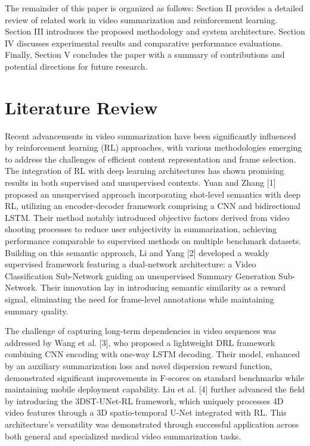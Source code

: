 \documentclass[conference]{IEEEtran}
\begin{document}
The remainder of this paper is organized as follows: Section II provides a detailed review of related work in video summarization and reinforcement learning. Section III introduces the proposed methodology and system architecture. Section IV discusses experimental results and comparative performance evaluations. Finally, Section V concludes the paper with a summary of contributions and potential directions for future research.

\section{Literature Review}

Recent advancements in video summarization have been significantly influenced by reinforcement learning (RL) approaches, with various methodologies emerging to address the challenges of efficient content representation and frame selection. The integration of RL with deep learning architectures has shown promising results in both supervised and unsupervised contexts. Yuan and Zhang [1] proposed an unsupervised approach incorporating shot-level semantics with deep RL, utilizing an encoder-decoder framework comprising a CNN and bidirectional LSTM. Their method notably introduced objective factors derived from video shooting processes to reduce user subjectivity in summarization, achieving performance comparable to supervised methods on multiple benchmark datasets. Building on this semantic approach, Li and Yang [2] developed a weakly supervised framework featuring a dual-network architecture: a Video Classification Sub-Network guiding an unsupervised Summary Generation Sub-Network. Their innovation lay in introducing semantic similarity as a reward signal, eliminating the need for frame-level annotations while maintaining summary quality.

The challenge of capturing long-term dependencies in video sequences was addressed by Wang et al. [3], who proposed a lightweight DRL framework combining CNN encoding with one-way LSTM decoding. Their model, enhanced by an auxiliary summarization loss and novel dispersion reward function, demonstrated significant improvements in F-scores on standard benchmarks while maintaining mobile deployment capability. Liu et al. [4] further advanced the field by introducing the 3DST-UNet-RL framework, which uniquely processes 4D video features through a 3D spatio-temporal U-Net integrated with RL. This architecture's versatility was demonstrated through successful application across both general and specialized medical video summarization tasks.
\end{document}
